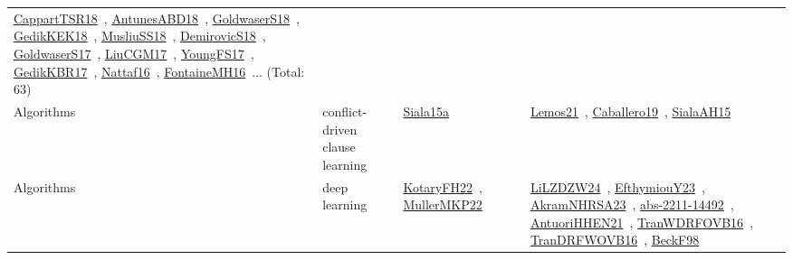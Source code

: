 {\begin{longtable}{lp{3cm}>{\raggedright\arraybackslash}p{6cm}>{\raggedright\arraybackslash}p{6cm}>{\raggedright\arraybackslash}p{8cm}}
\href{../works/CappartTSR18.pdf}{CappartTSR18}~\cite{CappartTSR18}, \href{../works/AntunesABD18.pdf}{AntunesABD18}~\cite{AntunesABD18}, \href{../works/GoldwaserS18.pdf}{GoldwaserS18}~\cite{GoldwaserS18}, \href{../works/GedikKEK18.pdf}{GedikKEK18}~\cite{GedikKEK18}, \href{../works/MusliuSS18.pdf}{MusliuSS18}~\cite{MusliuSS18}, \href{../works/DemirovicS18.pdf}{DemirovicS18}~\cite{DemirovicS18}, \href{../works/GoldwaserS17.pdf}{GoldwaserS17}~\cite{GoldwaserS17}, \href{../works/LiuCGM17.pdf}{LiuCGM17}~\cite{LiuCGM17}, \href{../works/YoungFS17.pdf}{YoungFS17}~\cite{YoungFS17}, \href{../works/GedikKBR17.pdf}{GedikKBR17}~\cite{GedikKBR17}, \href{../works/Nattaf16.pdf}{Nattaf16}~\cite{Nattaf16}, \href{../works/FontaineMH16.pdf}{FontaineMH16}~\cite{FontaineMH16}... (Total: 63)\\
Algorithms & conflict-driven clause learning & \href{../works/Siala15a.pdf}{Siala15a}~\cite{Siala15a} &  & \href{../works/Lemos21.pdf}{Lemos21}~\cite{Lemos21}, \href{../works/Caballero19.pdf}{Caballero19}~\cite{Caballero19}, \href{../works/SialaAH15.pdf}{SialaAH15}~\cite{SialaAH15}\\
Algorithms & deep learning & \href{../works/KotaryFH22.pdf}{KotaryFH22}~\cite{KotaryFH22}, \href{../works/MullerMKP22.pdf}{MullerMKP22}~\cite{MullerMKP22} &  & \href{../works/LiLZDZW24.pdf}{LiLZDZW24}~\cite{LiLZDZW24}, \href{../works/EfthymiouY23.pdf}{EfthymiouY23}~\cite{EfthymiouY23}, \href{../works/AkramNHRSA23.pdf}{AkramNHRSA23}~\cite{AkramNHRSA23}, \href{../works/abs-2211-14492.pdf}{abs-2211-14492}~\cite{abs-2211-14492}, \href{../works/AntuoriHHEN21.pdf}{AntuoriHHEN21}~\cite{AntuoriHHEN21}, \href{../works/TranWDRFOVB16.pdf}{TranWDRFOVB16}~\cite{TranWDRFOVB16}, \href{../works/TranDRFWOVB16.pdf}{TranDRFWOVB16}~\cite{TranDRFWOVB16}, \href{../works/BeckF98.pdf}{BeckF98}~\cite{BeckF98}\\

\end{longtable}}
